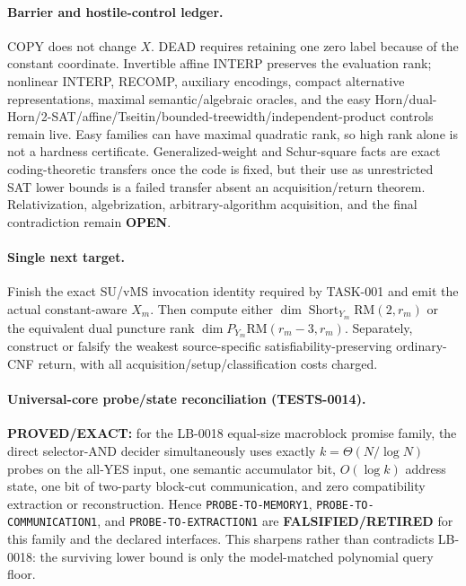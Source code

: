 \documentclass[11pt]{article}
\begin{document}
\paragraph{Barrier and hostile-control ledger.}
COPY does not change \(X\).  DEAD requires retaining one zero label because of the constant coordinate.  Invertible affine INTERP preserves the evaluation rank; nonlinear INTERP, RECOMP, auxiliary encodings, compact alternative representations, maximal semantic/algebraic oracles, and the easy Horn/dual-Horn/2-SAT/affine/Tseitin/bounded-treewidth/independent-product controls remain live.  Easy families can have maximal quadratic rank, so high rank alone is not a hardness certificate.  Generalized-weight and Schur-square facts are exact coding-theoretic transfers once the code is fixed, but their use as unrestricted SAT lower bounds is a failed transfer absent an acquisition/return theorem.  Relativization, algebrization, arbitrary-algorithm acquisition, and the final contradiction remain \textbf{OPEN}.

\paragraph{Single next target.}
Finish the exact SU/vMS invocation identity required by TASK-001 and emit the actual constant-aware \(X_m\).  Then compute either \(\dim\operatorname{Short}_{Y_m}\mathrm{RM}(2,r_m)\) or the equivalent dual puncture rank \(\dim P_{Y_m}\mathrm{RM}(r_m-3,r_m)\).  Separately, construct or falsify the weakest source-specific satisfiability-preserving ordinary-CNF return, with all acquisition/setup/classification costs charged.


\paragraph{Universal-core probe/state reconciliation (TESTS-0014).}
\textbf{PROVED/EXACT:} for the LB-0018 equal-size macroblock promise family, the direct selector-AND decider simultaneously uses exactly \(k=\Theta(N/\log N)\) probes on the all-YES input, one semantic accumulator bit, \(O(\log k)\) address state, one bit of two-party block-cut communication, and zero compatibility extraction or reconstruction.  Hence \texttt{PROBE-TO-MEMORY1}, \texttt{PROBE-TO-COMMUNICATION1}, and \texttt{PROBE-TO-EXTRACTION1} are \textbf{FALSIFIED/RETIRED} for this family and the declared interfaces.  This sharpens rather than contradicts LB-0018: the surviving lower bound is only the model-matched polynomial query floor.
\end{document}
